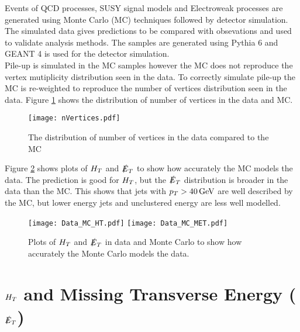 Events of QCD processes, SUSY signal models and Electroweak processes are 
generated using Monte Carlo (MC) techniques followed by detector simulation. The
simulated data gives predictions to be compared with obsevations and used to 
validate analysis methods. The samples are generated using Pythia 6 
\cite{pythia6} and GEANT 4 \cite{geant} is used for the detector simulation. \\

Pile-up is simulated in the MC samples however the MC does not reproduce the 
vertex mutiplicity distribution seen in the data. To correctly simulate pile-up 
the MC is re-weighted to reproduce the number of vertices distribution seen in 
the data. Figure \ref{fig:nVertices} shows the distribution of number of 
vertices in the data and MC. \\

\begin{figure}
\begin{center}
\texttt{[image: nVertices.pdf]}
\end{center}
\caption{The distribution of number of vertices in the data compared to the MC}
\label{fig:nVertices}
\end{figure}

Figure \ref{fig:Data_vs_MC} shows plots of $H_{T}$ and $\slashed{E}_{T}$ to show how 
accurately the MC models the data. The prediction is good for $H_{T}$, but the 
$\slashed{E}_{T}$ distribution is broader in the data than the MC. This shows that jets 
with $p_{T} > 40 \, \mathrm{GeV}$ are well described by the MC, but lower energy jets 
and unclustered energy are less well modelled. \\

\begin{figure}
\texttt{[image: Data\_MC\_HT.pdf]}
\texttt{[image: Data\_MC\_MET.pdf]}
\caption{Plots of $H_{T}$ and $\slashed{E}_{T}$ in data and Monte Carlo to show how accurately
the Monte Carlo models the data.}
\label{fig:Data_vs_MC}
\end{figure}


\section{$H_{T}$ and Missing Transverse Energy ($\slashed{E}_{T}$)}

